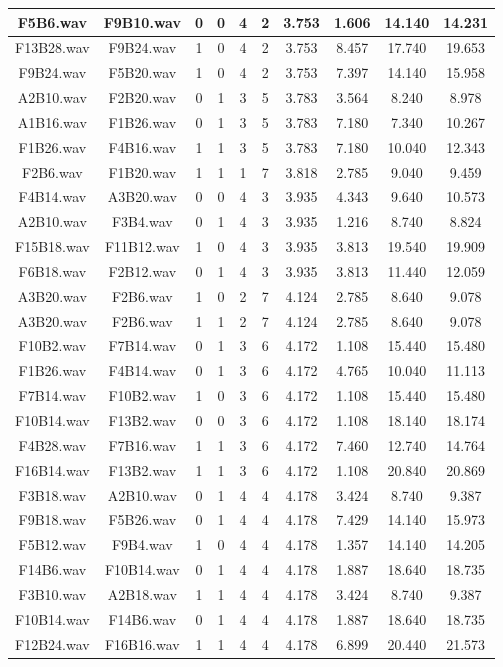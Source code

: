 \documentclass[11pt,a4paper]{book}
\begin{document}
\begin{longtable}[c]{|c|c|c|c|c|c|c|c|c|c|}
F5B6.wav&F9B10.wav&0&0&4&2&3.753&1.606&14.140&14.231\\ \hline
F13B28.wav&F9B24.wav&1&0&4&2&3.753&8.457&17.740&19.653\\ \hline
F9B24.wav&F5B20.wav&1&0&4&2&3.753&7.397&14.140&15.958\\ \hline
A2B10.wav&F2B20.wav&0&1&3&5&3.783&3.564&8.240&8.978\\ \hline
A1B16.wav&F1B26.wav&0&1&3&5&3.783&7.180&7.340&10.267\\ \hline
F1B26.wav&F4B16.wav&1&1&3&5&3.783&7.180&10.040&12.343\\ \hline
F2B6.wav&F1B20.wav&1&1&1&7&3.818&2.785&9.040&9.459\\ \hline
F4B14.wav&A3B20.wav&0&0&4&3&3.935&4.343&9.640&10.573\\ \hline
A2B10.wav&F3B4.wav&0&1&4&3&3.935&1.216&8.740&8.824\\ \hline
F15B18.wav&F11B12.wav&1&0&4&3&3.935&3.813&19.540&19.909\\ \hline
F6B18.wav&F2B12.wav&0&1&4&3&3.935&3.813&11.440&12.059\\ \hline
A3B20.wav&F2B6.wav&1&0&2&7&4.124&2.785&8.640&9.078\\ \hline
A3B20.wav&F2B6.wav&1&1&2&7&4.124&2.785&8.640&9.078\\ \hline
F10B2.wav&F7B14.wav&0&1&3&6&4.172&1.108&15.440&15.480\\ \hline
F1B26.wav&F4B14.wav&0&1&3&6&4.172&4.765&10.040&11.113\\ \hline
F7B14.wav&F10B2.wav&1&0&3&6&4.172&1.108&15.440&15.480\\ \hline
F10B14.wav&F13B2.wav&0&0&3&6&4.172&1.108&18.140&18.174\\ \hline
F4B28.wav&F7B16.wav&1&1&3&6&4.172&7.460&12.740&14.764\\ \hline
F16B14.wav&F13B2.wav&1&1&3&6&4.172&1.108&20.840&20.869\\ \hline
F3B18.wav&A2B10.wav&0&1&4&4&4.178&3.424&8.740&9.387\\ \hline
F9B18.wav&F5B26.wav&0&1&4&4&4.178&7.429&14.140&15.973\\ \hline
F5B12.wav&F9B4.wav&1&0&4&4&4.178&1.357&14.140&14.205\\ \hline
F14B6.wav&F10B14.wav&0&1&4&4&4.178&1.887&18.640&18.735\\ \hline
F3B10.wav&A2B18.wav&1&1&4&4&4.178&3.424&8.740&9.387\\ \hline
F10B14.wav&F14B6.wav&0&1&4&4&4.178&1.887&18.640&18.735\\ \hline
F12B24.wav&F16B16.wav&1&1&4&4&4.178&6.899&20.440&21.573\\ \hline

\end{longtable}
\end{document}
